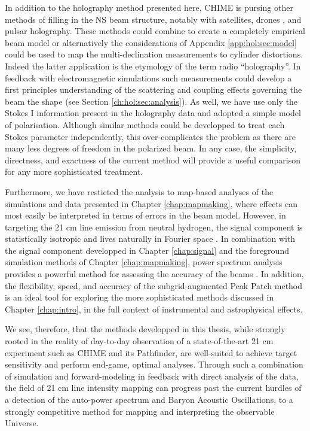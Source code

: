 In addition to the holography method presented here, CHIME is pursing other methods of filling in the NS beam structure, notably with satellites\citep{hol2, sat2}, drones \citep{drone}, and pulsar holography. These methods could combine to create a completely empirical beam model or alternatively the considerations of Appendix \ref{app:hol:sec:model} could be used to map the multi-declination measurements to cylinder distortions. Indeed the latter application is the etymology of the term radio ``holography''. In feedback with electromagnetic simulations such measurements could develop a first principles understanding of the scattering and coupling effects governing the beam the shape (see Section \ref{ch:hol:sec:analysis}). As well, we have use only the Stokes I information present in the holography data and adopted a simple model of polarisation. Although similar methods could be developped to treat each Stokes parameter independently, this over-complicates the problem as there are many less degrees of freedom in the polarized beam\citep{holpol}. In any case, the simplicity, directness, and exactness of the current method will provide a useful comparison for any more sophisticated treatment.

Furthermore, we have resticted the analysis to map-based analyses of the simulations and data presented in Chapter \ref{chap:mapmaking}, where effects can most easily be interpreted in terms of errors in the beam model. However, in targeting the 21 cm line emission from neutral hydrogen, the signal component is statistically isotropic and lives naturally in Fourier space \citep{mmodes2}. In combination with the signal component developped in Chapter \ref{chap:signal} and the foreground simulation methods of Chapter \ref{chap:mapmaking}, power spectrum analysis provides a powerful method for assessing the accuracy of the beams \citep{wedge1, wedge2}. In addition, the flexibility, speed, and accuracy of the subgrid-augmented Peak Patch method is an ideal tool for exploring the more sophisticated methods discussed in Chapter \ref{chap:intro}, in the full context of instrumental and astrophysical effects.

We see, therefore, that the methods developped in this thesis, while strongly rooted in the reality of day-to-day observation of a state-of-the-art 21 cm experiment such as CHIME and its Pathfinder, are well-suited to achieve target sensitivity and perform end-game, optimal analyses. Through such a combination of simulation and forward-modeling in feedback with direct analysis of the data, the field of 21 cm line intensity mapping can progress past the current hurdles of a detection of the auto-power spectrum and Baryon Acoustic Oscillations, to a strongly competitive method for mapping and interpreting the observable Universe.